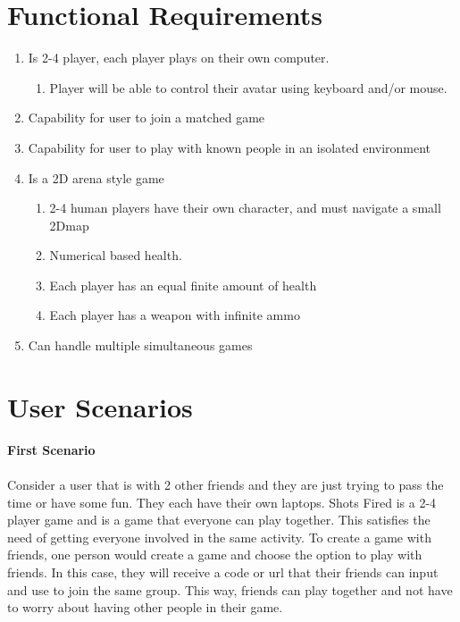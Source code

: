 \documentclass[11pt, oneside]{article}   	%
\begin{document}
\clearpage

\section{Functional Requirements}
\begin{enumerate}
\item Is 2-4 player, each player plays on their own computer. 
\begin{enumerate}
\item Player will be able to control their avatar using keyboard and/or mouse. 
\end{enumerate}
\item Capability for user to join a matched game
\item Capability for user to play with known people in an isolated environment
\item Is a 2D arena style game
\begin{enumerate}
\item 2-4 human players have their own character, and must navigate a small 2Dmap
\item Numerical based health.
\item Each player has an equal finite amount of health
\item Each player has a weapon with infinite ammo
\end{enumerate}
\item Can handle multiple simultaneous games
\end{enumerate}

\section{User Scenarios}


\textbf{First Scenario}\\\\

Consider a user that is with 2 other friends and they are just trying to pass the time or have some fun. They each have their own laptops. Shots Fired is a 2-4 player game and is a game that everyone can play together. This satisfies the need of getting everyone involved in the same activity. To create a game with friends, one person would create a game and choose the option to play with friends. In this case, they will receive a code or url that their friends can input and use to join the same group. This way, friends can play together and not have to worry about having other people in their game. \\\\
\end{document}
